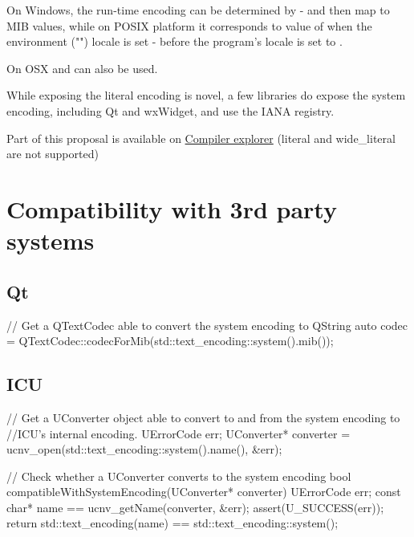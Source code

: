 \documentclass{wg21}
\begin{document}
On Windows, the run-time encoding can be determined by  - and then map to MIB values, while on POSIX platform it corresponds to value of  when the environment ("") locale is set - before the program's locale is set to .

On OSX  and  can also be used.


While exposing the literal encoding is novel, a few libraries do expose the system encoding, including Qt and wxWidget, and use the IANA registry.

Part of this proposal is available on \href{https://compiler-explorer.com/z/7D3Z3x}{Compiler explorer}
(literal and wide_literal are not supported)


\section{Compatibility with 3rd party systems}

\subsection{Qt}

\begin{colorblock}
// Get a QTextCodec able to convert the system encoding to QString
auto codec = QTextCodec::codecForMib(std::text_encoding::system().mib());
\end{colorblock}

\subsection{ICU}

\begin{colorblock}
// Get a UConverter object able to convert to and from the system encoding to
//ICU's internal encoding.
UErrorCode err;
UConverter* converter = ucnv_open(std::text_encoding::system().name(), &err);
\end{colorblock}

\begin{colorblock}
// Check whether a UConverter converts to the system encoding
bool compatibleWithSystemEncoding(UConverter* converter)
{
    UErrorCode err;
    const char* name == ucnv_getName(converter, &err);
    assert(U_SUCCESS(err));
    return std::text_encoding(name) == std::text_encoding::system();
}
\end{colorblock}
\end{document}
